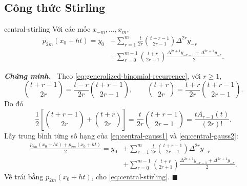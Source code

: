 \documentclass[12pt,a4paper,oneside]{book}
\numberwithin{algorithm}{chapter}
\theoremstyle{definition}
\newenvironment{chungminh}{\par\medskip\noindent\textbf{\textit{\color{mainblue}Chứng minh.}}\ }{\hfill$\blacksquare$\par\medskip}
\begin{document}
\subsection{Công thức Stirling}
\begin{dinhly}{}{central-stirling}
Với các mốc $x_{-m},\ldots,x_m$,
\begin{equation}\label{eq:central-stirling}
\begin{split}
 p_{2m}(x_0+ht)=y_0
 &+\sum_{r=1}^{m}\frac{t}{2r}\binom{t+r-1}{2r-1}\Delta^{2r}y_{-r}\\
 &+\sum_{r=0}^{m-1}\binom{t+r}{2r+1}
 \frac{\Delta^{2r+1}y_{-r-1}+\Delta^{2r+1}y_{-r}}2.
\end{split}
\end{equation}
\end{dinhly}
\begin{chungminh}
Theo \eqref{eq:generalized-binomial-recurrence}, với $r\geq1$,
\[
 \binom{t+r-1}{2r}=\frac{t-r}{2r}\binom{t+r-1}{2r-1},\qquad
 \binom{t+r}{2r}=\frac{t+r}{2r}\binom{t+r-1}{2r-1}.
\]
Do đó
\[
 \frac12\left[\binom{t+r-1}{2r}+\binom{t+r}{2r}\right]
 =\frac{t}{2r}\binom{t+r-1}{2r-1}
 =\frac{tA_{r-1}(t)}{(2r)!}.
\]
Lấy trung bình từng số hạng của \eqref{eq:central-gauss1} và \eqref{eq:central-gauss2}:
\begin{align*}
 \frac{p_{2m}(x_0+ht)+p_{2m}(x_0+ht)}2
 =y_0&+\sum_{r=1}^{m}\frac{t}{2r}\binom{t+r-1}{2r-1}\Delta^{2r}y_{-r}\\
 &+\sum_{r=0}^{m-1}\binom{t+r}{2r+1}
 \frac{\Delta^{2r+1}y_{-r-1}+\Delta^{2r+1}y_{-r}}2.
\end{align*}
Vế trái bằng $p_{2m}(x_0+ht)$, cho \eqref{eq:central-stirling}.
\end{chungminh}
\end{document}
